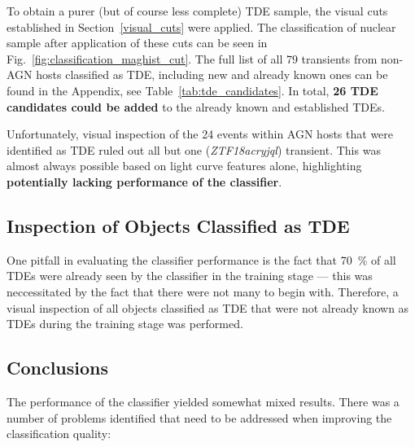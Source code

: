 To obtain a purer (but of course less complete) TDE sample, the visual cuts established in Section~\ref{visual_cuts} were applied. The classification of nuclear sample after application of these cuts can be seen in Fig.~\ref{fig:classification_maghist_cut}. The full list of all 79 transients from non-AGN hosts classified as TDE, including new and already known ones can be found in the Appendix, see Table~\ref{tab:tde_candidates}. In total, \textbf{26 TDE candidates could be added} to the already known and established TDEs.

Unfortunately, visual inspection of the 24 events within AGN hosts that were identified as TDE ruled out all but one (\textit{ZTF18acryjql}) transient. This was almost always possible based on light curve features alone, highlighting \textbf{potentially lacking performance of the classifier}.

\subsection{Inspection of Objects Classified as TDE}\label{all_tde_inspection}
One pitfall in evaluating the classifier performance is the fact that \SI{70}{\percent} of all TDEs were already seen by the classifier in the training stage --- this was neccessitated by the fact that there were not many to begin with. Therefore, a visual inspection of all objects classified as TDE that were not already known as TDEs during the training stage was performed.

\subsection{Conclusions}
The performance of the classifier yielded somewhat mixed results. There was a number of problems identified that need to be addressed when improving the classification quality:

